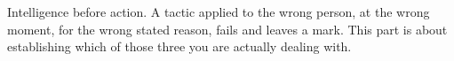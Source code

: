 
\begin{partblurb}
Intelligence before action. A tactic applied to the wrong person, at the wrong moment, for the wrong stated reason, fails and leaves a mark. This part is about establishing which of those three you are actually dealing with.
\end{partblurb}
